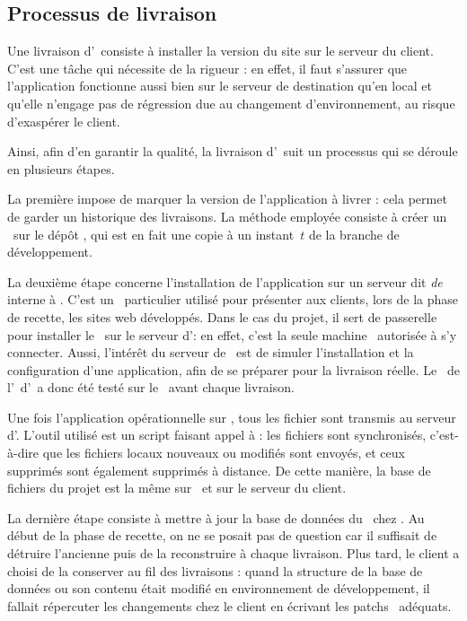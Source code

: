 \subsection{Processus de livraison}
\label{section:eyrolles_prod}

Une livraison d'\aey\ consiste à installer la version du site sur le serveur du client. C'est une tâche qui nécessite de la rigueur : en effet, il faut s'assurer que l'application fonctionne aussi bien sur le serveur de destination qu'en local et qu'elle n'engage pas de régression due au changement d'environnement, au risque d'exaspérer le client.

Ainsi, afin d'en garantir la qualité, la livraison d'\aey\ suit un processus qui se déroule en plusieurs étapes.

La première impose de marquer la version de l'application à livrer : cela permet de garder un historique des livraisons. La méthode employée consiste à créer un \atag\ sur le dépôt \asvn, qui est en fait une copie à un instant~$t$ de la branche de développement.

La deuxième étape concerne l'installation de l'application sur un serveur dit \emph{de \astaging} interne à \asl. C'est un \avserver\ particulier utilisé pour présenter aux clients, lors de la phase de recette, les sites web développés. Dans le cas du projet, il sert de passerelle pour installer le \alotdeux\ sur le serveur d'\aey : en effet, c'est la seule \og machine \fg\ autorisée à s'y connecter. Aussi, l'intérêt du serveur de \astaging\ est de simuler l'installation et la configuration d'une application, afin de se préparer pour la livraison réelle. Le \alotdeux\ de l'\aintranet\ d'\aey\ a donc été testé sur le \astaging\ avant chaque livraison.

Une fois l'application opérationnelle sur \astaging, tous les fichier sont transmis au serveur d'\aey. L'outil utilisé est un script faisant appel à \arsync : les fichiers sont synchronisés, c'est-à-dire que les fichiers locaux nouveaux ou modifiés sont envoyés, et ceux supprimés sont également supprimés à distance. De cette manière, la base de fichiers du projet est la même sur \astaging\ et sur le serveur du client.

La dernière étape consiste à mettre à jour la base de données du \alotdeux\ chez \aey. Au début de la phase de recette, on ne se posait pas de question car il suffisait de détruire l'ancienne puis de la reconstruire à chaque livraison. Plus tard, le client a choisi de la conserver au fil des livraisons : quand la structure de la base de données ou son contenu était modifié en environnement de développement, il fallait répercuter les changements chez le client en écrivant les patchs \asql\ adéquats.
